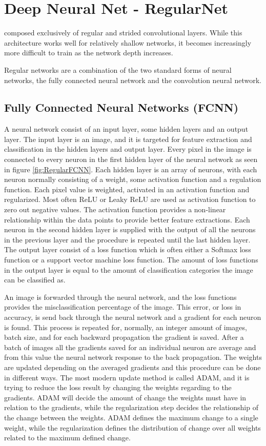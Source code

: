 \section{Deep Neural Net - RegularNet}
composed exclusively of regular and strided convolutional layers. While this architecture works well for relatively shallow networks, it becomes increasingly more difficult to train as the network depth increases.

Regular networks are a combination of the two standard forms of neural networks, the fully connected neural network and the convolution neural network.

\subsection{Fully Connected Neural Networks (FCNN)}
A neural network consist of an input layer, some hidden layers and an output layer. The input layer is an image, and it is targeted for feature extraction and classification in the hidden layers and output layer. Every pixel in the image is connected to every neuron in the first hidden layer of the neural network as seen in figure \ref{fig:RegularFCNN}.    
Each hidden layer is an array of neurons, with each neuron normally consisting of a weight, some activation function and a regulation function. Each pixel value is weighted, activated in an activation function and regularized. Most often ReLU or Leaky ReLU are used as activation function to zero out negative values. The activation function provides a non-linear relationship within the data points to provide better feature extractions. Each neuron in the second hidden layer is supplied with the output of all the neurons in the previous layer and the procedure is repeated until the last hidden layer. The output layer consist of a loss function which is often either a Softmax loss function or a support vector machine loss function. The amount of loss functions in the output layer is equal to the amount of classification categories the image can be classified as.

An image is forwarded through the neural network, and the loss functions provides the misclassification percentage of the image. This error, or loss in accuracy, is send back through the neural network and a gradient for each neuron is found. This process is repeated for, normally, an integer amount of images, batch size, and for each backward propagation the gradient is saved. After a batch of images all the gradients saved for an individual neuron are average and from this value the neural network response to the back propagation. The weights are updated depending on the averaged gradients and this procedure can be done in different ways. The most modern update method is called ADAM, and it is trying to reduce the loss result by changing the weights regarding to the gradients. ADAM will decide the amount of change the weights must have in relation to the gradients, while the regularization step decides the relationship of the change between the weights. ADAM defines the maximum change to a single weight, while the regularization defines the distribution of change over all weights related to the maximum defined change.

